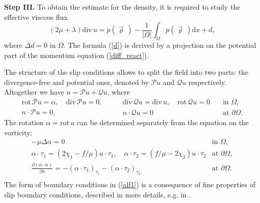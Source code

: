 \documentclass[11pt]{article}
\newcommand{\dd}{\mathrm{d}}
\newcommand{\ddiv}{\mathrm{div\,}}
\renewcommand{\div}{\mathrm{div}}
\newcommand{\rot}{\mathrm{rot}}
\newcommand{\cP}{\mathcal{P}}
\newcommand{\cQ}{\mathcal{Q}}
\numberwithin{equation}{section}
\numberwithin{tw}{section}
\begin{document}
\smallskip 
 
{\bf Step III.}
 To obtain the estimate for the density, it is required to study the effective viscous flux
 \begin{equation}\label{d} (2\mu+\lambda)\ddiv u = p(\vec\varrho\,)-\frac{1}{|\Omega|}\int_\Omega p(\vec\varrho\,)\dd x + d, \end{equation}
where $\Delta d=0$ in $\Omega$. 
The formula (\ref{d}) is derived by a projection on the potential part of the momentum equation (\ref{diff_react}).

The structure of the slip conditions allows to split the field into two parts:
the divergence-free and potential ones, denoted by $\cP u$ and $\cQ u $ respectively. Altogether we have $u=\cP u + \cQ u$, where
\begin{equation}
    \begin{array}{l}
 \rot \, \cP u = \alpha,\quad \div \, \cP u =0,   \\
n \cdot \cP u=0,
    \end{array}
    \qquad
    \begin{array}{ll}
   \div \, \cQ u = \div\, u,\quad \rot \, \cQ u =0 \quad & \mbox{in }
   \Omega,\\
n\cdot \cQ u=0 & \mbox{at } \partial \Omega.
    \end{array}
\end{equation}
The rotation $\alpha = \rot \,u$ can be determined separately from the equation on the vorticity:
\begin{equation}\label{alf1}
\begin{array}{ll}
    -\mu \Delta \alpha =0 & \mbox{in } \Omega,\\
    \alpha \cdot \tau_1=(2\chi_1 -f/\mu) u \cdot \tau_1,\quad
    \alpha \cdot \tau_2=(f/\mu -2\chi_2) u\cdot \tau_2 & \mbox{at } \partial \Omega,\\
    \frac{\partial(\alpha \cdot n)}{\partial n}=-(\alpha\cdot \tau_1)_{\tau_1} - (\alpha\cdot \tau_2)_{\tau_2}
    & \mbox{at } \partial \Omega.\\
    \end{array}
\end{equation}
The form of boundary conditions in (\ref{alf1}) is a consequence of fine properties of 
slip boundary conditions, described in more details, e.g. in \cite{Mucha, Mucha-Rautmann}.
\end{document}
